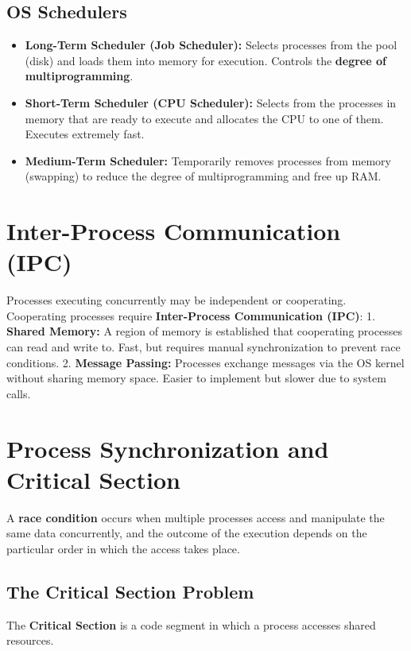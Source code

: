 \documentclass[12pt,a4paper]{article}
\begin{document}
\subsection{OS Schedulers}
\begin{itemize}[leftmargin=*, itemsep=3pt]
  \item \textbf{Long-Term Scheduler (Job Scheduler):} Selects processes from the pool (disk) and loads them into memory for execution. Controls the \textbf{degree of multiprogramming}.
  \item \textbf{Short-Term Scheduler (CPU Scheduler):} Selects from the processes in memory that are ready to execute and allocates the CPU to one of them. Executes extremely fast.
  \item \textbf{Medium-Term Scheduler:} Temporarily removes processes from memory (swapping) to reduce the degree of multiprogramming and free up RAM.
\end{itemize}

\section{Inter-Process Communication (IPC)}

Processes executing concurrently may be independent or cooperating. Cooperating processes require \textbf{Inter-Process Communication (IPC)}:
1. \textbf{Shared Memory:} A region of memory is established that cooperating processes can read and write to. Fast, but requires manual synchronization to prevent race conditions.
2. \textbf{Message Passing:} Processes exchange messages via the OS kernel without sharing memory space. Easier to implement but slower due to system calls.

\section{Process Synchronization and Critical Section}

A \textbf{race condition} occurs when multiple processes access and manipulate the same data concurrently, and the outcome of the execution depends on the particular order in which the access takes place.

\subsection{The Critical Section Problem}
The \textbf{Critical Section} is a code segment in which a process accesses shared resources.
\end{document}
